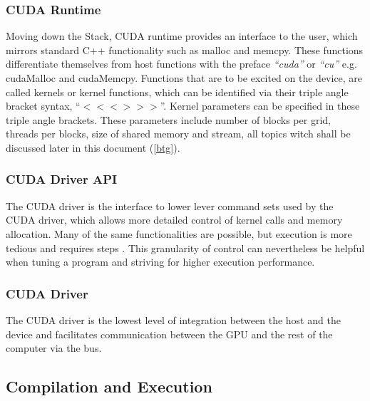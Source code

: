 \subsubsection{CUDA Runtime}

Moving down the Stack, CUDA runtime provides an interface to the user, which mirrors
standard C++ functionality such as malloc and memcpy.  These functions differentiate
themselves from host functions with the preface \textit{``cuda''} or \textit{``cu''}
e.g. cudaMalloc and cudaMemcpy.  Functions that are to be excited on the
device, are called kernels or kernel functions, which can be identified
 via their triple angle bracket syntax, ``$<<< >>>$''.
Kernel parameters can be specified in these triple angle brackets.  These parameters
include number of blocks per grid, threads per blocks, size of shared memory and
stream, all topics witch shall be discussed later in this document (\ref{btg}).

\subsubsection{CUDA Driver API}
The CUDA driver is the interface to lower lever command sets used by the CUDA driver, which allows more detailed control
of kernel calls and memory allocation. Many of the same functionalities are possible,
but execution is more tedious and requires steps \cite{driver}. This granularity of control can nevertheless be
helpful when tuning a program and striving for higher execution performance.
\subsubsection{CUDA Driver}

The CUDA driver is the lowest level of integration between the host and the device
and facilitates communication between the \Gls{GPU} and the rest of the computer via the bus. %


\subsection{Compilation and Execution}



